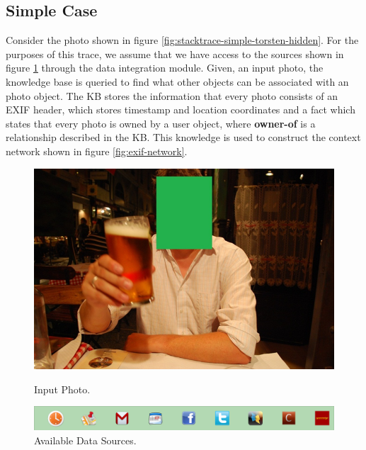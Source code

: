 \subsection{Simple Case}

Consider the photo shown in figure \ref{fig:stacktrace-simple-torsten-hidden}. For the purposes of this trace, we assume that we have access to the sources shown in figure \ref{fig:stacktrace-simple-sources} through the data integration module. Given, an input photo, the knowledge base is queried to find what other objects can be associated with an photo object. The KB stores the information that every photo consists of an EXIF header, which stores timestamp and location coordinates and a fact which states that every photo is owned by a user object, where \textbf{owner-of} is a relationship described in the KB. This knowledge is used to construct the context network shown in figure \ref{fig:exif-network}.

\begin{figure}[ht]
\begin{minipage}[b]{0.45\linewidth}
\centering
\includegraphics[width=\textwidth]{media/chapter4/stacktrace/torsten-hidden.png}
\caption{Input Photo.}
\label{fig:stacktrace-simple-torsten-hidden}
\end{minipage}
\hspace{0.5cm}
\begin{minipage}[b]{0.45\linewidth}
\centering
\includegraphics[width=\textwidth]{media/chapter4/stacktrace/sources.png}
\caption{Available Data Sources.}
\label{fig:stacktrace-simple-sources}
\end{minipage}
\end{figure}

